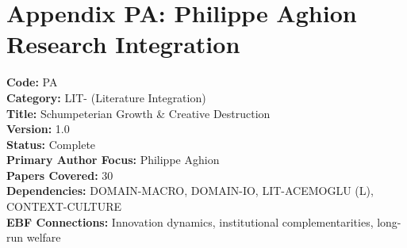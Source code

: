 
\chapter*{Appendix PA: Philippe Aghion Research Integration}
\label{app:aghion}

\begin{tcolorbox}[colback=blue!5!white, colframe=blue!75!black, title=Appendix Metadata]
\textbf{Code:} PA \\
\textbf{Category:} LIT- (Literature Integration) \\
\textbf{Title:} Schumpeterian Growth \& Creative Destruction \\
\textbf{Version:} 1.0 \\
\textbf{Status:} Complete \\
\textbf{Primary Author Focus:} Philippe Aghion \\
\textbf{Papers Covered:} 30 \\
\textbf{Dependencies:} DOMAIN-MACRO, DOMAIN-IO, LIT-ACEMOGLU (L), CONTEXT-CULTURE \\
\textbf{EBF Connections:} Innovation dynamics, institutional complementarities, long-run welfare
\end{tcolorbox}

